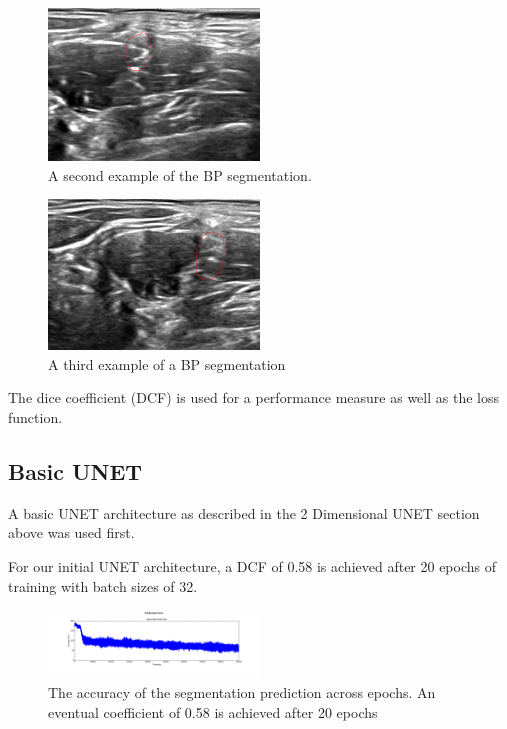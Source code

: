 \documentclass[letterpaper]{article}
\begin{document}
 \begin{figure}[H]
  \centerline{\includegraphics[width=0.5\textwidth]{Images/SegmentExample2.png}}
  \caption{A second example of the BP segmentation.}
  \label{fig:BPSegmentation2}
\end{figure}

 \begin{figure}[H]
  \centerline{\includegraphics[width=0.5\textwidth]{Images/SegmentExample3.png}}
  \caption{A third example of a BP segmentation}
  \label{fig:BPSegmentation3}
\end{figure}

The dice coefficient (DCF) is used for a performance measure as well as the loss function. 

\subsection{Basic UNET}
A basic UNET architecture as described in the 2 Dimensional UNET section above was used first. 

For our initial UNET architecture, a DCF of 0.58 is achieved after 20 epochs of training with batch sizes of 32. 

 \begin{figure}[H]
  \centerline{\includegraphics[width=0.5\textwidth]{Plots/AverageErrorKullEvery5000.png}}
  \caption{The accuracy of the segmentation prediction across epochs. An eventual coefficient of 0.58 is achieved after 20 epochs}
  \label{fig:trainingovertime.}
\end{figure}
\end{document}
